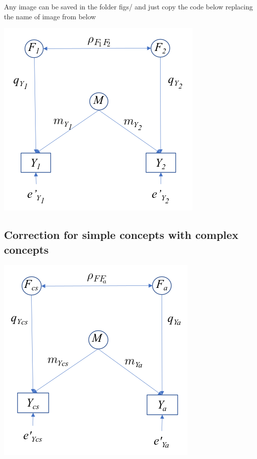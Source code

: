 \documentclass[
]{jss}
\begin{document}
Any image can be saved in the folder figs/ and just copy the code below
replacing the name of image from below

\begin{CodeChunk}


\begin{center}\includegraphics[width=0.5\linewidth]{figs/simpleconcepts} \end{center}

\end{CodeChunk}

\hypertarget{correction-for-simple-concepts-with-complex-concepts}{%
\subsection{Correction for simple concepts with complex
concepts}\label{correction-for-simple-concepts-with-complex-concepts}}

\begin{CodeChunk}


\begin{center}\includegraphics[width=0.5\linewidth]{figs/simplecomplex} \end{center}

\end{CodeChunk}
\end{document}

